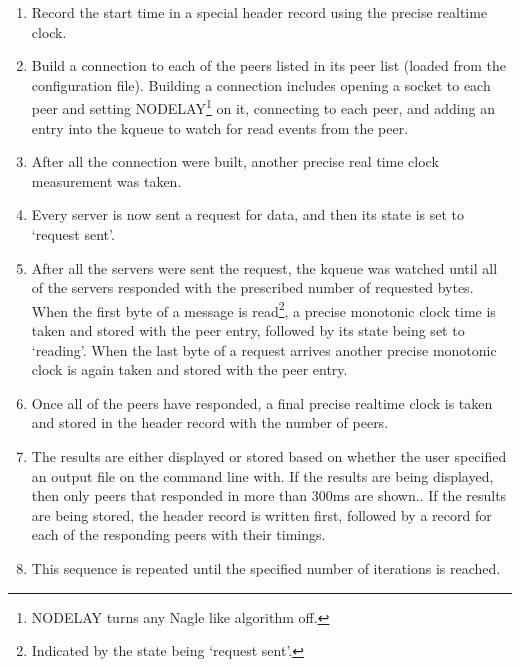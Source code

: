 \documentclass[12pt]{article}
\begin{document}
\begin{enumerate}

\item Record the start time in a special header record using the precise realtime clock.

\item Build a connection to each of the peers listed in its peer list (loaded from the configuration
file). Building a connection includes opening a socket to each peer and setting NODELAY\footnote{NODELAY turns 
any Nagle\cite{rfc896} like algorithm off.} on it, connecting to each peer, and adding an entry into 
the kqueue to watch for read events from the peer.

\item After all the connection were built, another precise real time clock measurement was
taken.

\item Every server is now sent a request for data, and then its state is set to `request sent'.

\item After all the servers were sent the request, the kqueue was watched until all of the servers
responded with the prescribed number of  requested bytes. When the first byte of a
message is read\footnote{Indicated by the state being `request
  sent'.}, a precise monotonic clock time
is taken and stored with the peer entry, followed by its state being set to `reading'. When the last byte of a request arrives another 
precise monotonic clock is again taken and stored with the peer entry.

\item Once all of the peers have responded, a final precise realtime clock is taken and stored
in the header record with the number of peers.

\item The results are either displayed or stored based on
whether the user specified an output file on the command line with. If the results are being
displayed, then only peers that responded in more than 300ms are shown..
If the results are being stored, the header record is written first, followed by a record for each of the
responding peers with their timings.

\item This sequence is repeated until the specified number of iterations is reached.

\end{enumerate}

\end{document}
